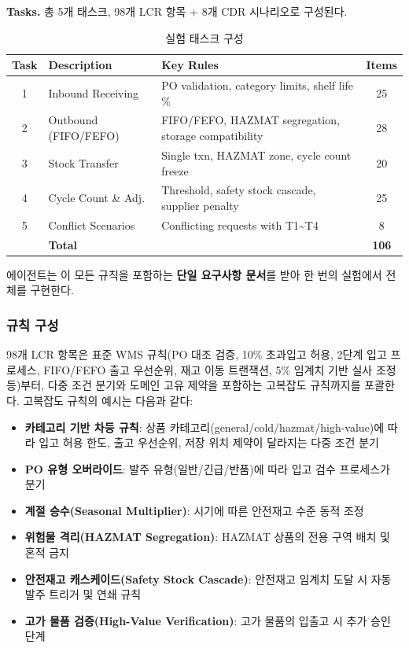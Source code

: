 \documentclass[conference]{IEEEtran}
\begin{document}
\textbf{Tasks.} 총 5개 태스크, 98개 LCR 항목 + 8개 CDR 시나리오로 구성된다.

\begin{table}[htbp]
\caption{실험 태스크 구성}
\label{tab:tasks}
\centering
\small
\begin{tabular}{@{}clp{2.5cm}c@{}}
\toprule
Task & Description & Key Rules & Items \\
\midrule
1 & Inbound Receiving & PO validation, category limits, shelf life \% & 25 \\
2 & Outbound (FIFO/FEFO) & FIFO/FEFO, HAZMAT segregation, storage compatibility & 28 \\
3 & Stock Transfer & Single txn, HAZMAT zone, cycle count freeze & 20 \\
4 & Cycle Count \& Adj. & Threshold, safety stock cascade, supplier penalty & 25 \\
5 & Conflict Scenarios & Conflicting requests with T1\textasciitilde T4 & 8 \\
\midrule
 & \textbf{Total} & & \textbf{106} \\
\bottomrule
\end{tabular}
\end{table}

에이전트는 이 모든 규칙을 포함하는 \textbf{단일 요구사항 문서}를 받아 한 번의 실험에서 전체를 구현한다.

\subsubsection{규칙 구성}

98개 LCR 항목은 표준 WMS 규칙(PO 대조 검증, 10\% 초과입고 허용, 2단계 입고 프로세스, FIFO/FEFO 출고 우선순위, 재고 이동 트랜잭션, 5\% 임계치 기반 실사 조정 등)부터, 다중 조건 분기와 도메인 고유 제약을 포함하는 고복잡도 규칙까지를 포괄한다. 고복잡도 규칙의 예시는 다음과 같다:
\begin{itemize}
  \item \textbf{카테고리 기반 차등 규칙}: 상품 카테고리(general/cold/hazmat/high-value)에 따라 입고 허용 한도, 출고 우선순위, 저장 위치 제약이 달라지는 다중 조건 분기
  \item \textbf{PO 유형 오버라이드}: 발주 유형(일반/긴급/반품)에 따라 입고 검수 프로세스가 분기
  \item \textbf{계절 승수(Seasonal Multiplier)}: 시기에 따른 안전재고 수준 동적 조정
  \item \textbf{위험물 격리(HAZMAT Segregation)}: HAZMAT 상품의 전용 구역 배치 및 혼적 금지
  \item \textbf{안전재고 캐스케이드(Safety Stock Cascade)}: 안전재고 임계치 도달 시 자동 발주 트리거 및 연쇄 규칙
  \item \textbf{고가 물품 검증(High-Value Verification)}: 고가 물품의 입출고 시 추가 승인 단계
\end{itemize}
\end{document}
